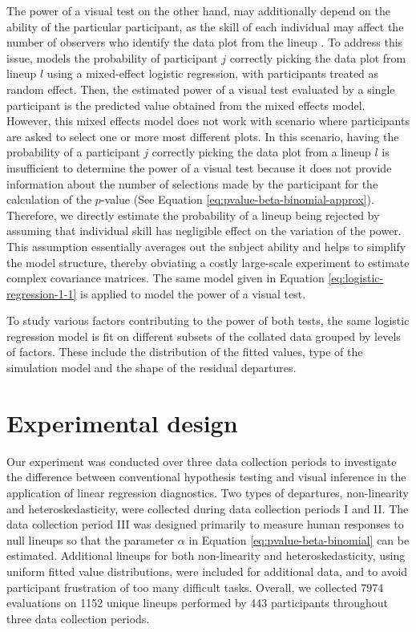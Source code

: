 \documentclass[]{interact}
\theoremstyle{plain}%
\theoremstyle{definition}
\theoremstyle{remark}
\begin{document}
The power of a visual test on the other hand, may additionally depend on
the ability of the particular participant, as the skill of each
individual may affect the number of observers who identify the data plot
from the lineup \citep{majumder2013validation}. To address this issue,
\citet{majumder2013validation} models the probability of participant
\(j\) correctly picking the data plot from lineup \(l\) using a
mixed-effect logistic regression, with participants treated as random
effect. Then, the estimated power of a visual test evaluated by a single
participant is the predicted value obtained from the mixed effects
model. However, this mixed effects model does not work with scenario
where participants are asked to select one or more most different plots.
In this scenario, having the probability of a participant \(j\)
correctly picking the data plot from a lineup \(l\) is insufficient to
determine the power of a visual test because it does not provide
information about the number of selections made by the participant for
the calculation of the \(p\)-value (See Equation
\ref{eq:pvalue-beta-binomial-approx}). Therefore, we directly estimate
the probability of a lineup being rejected by assuming that individual
skill has negligible effect on the variation of the power. This
assumption essentially averages out the subject ability and helps to
simplify the model structure, thereby obviating a costly large-scale
experiment to estimate complex covariance matrices. The same model given
in Equation \ref{eq:logistic-regression-1-1} is applied to model the
power of a visual test.

To study various factors contributing to the power of both tests, the
same logistic regression model is fit on different subsets of the
collated data grouped by levels of factors. These include the
distribution of the fitted values, type of the simulation model and the
shape of the residual departures.

\hypertarget{experimental-design}{%
\section{Experimental design}\label{experimental-design}}

Our experiment was conducted over three data collection periods to
investigate the difference between conventional hypothesis testing and
visual inference in the application of linear regression diagnostics.
Two types of departures, non-linearity and heteroskedasticity, were
collected during data collection periods I and II. The data collection
period III was designed primarily to measure human responses to null
lineups so that the parameter \(\alpha\) in Equation
\ref{eq:pvalue-beta-binomial} can be estimated. Additional lineups for
both non-linearity and heteroskedasticity, using uniform fitted value
distributions, were included for additional data, and to avoid
participant frustration of too many difficult tasks. Overall, we
collected 7974 evaluations on 1152 unique lineups performed by 443
participants throughout three data collection periods.
\end{document}
